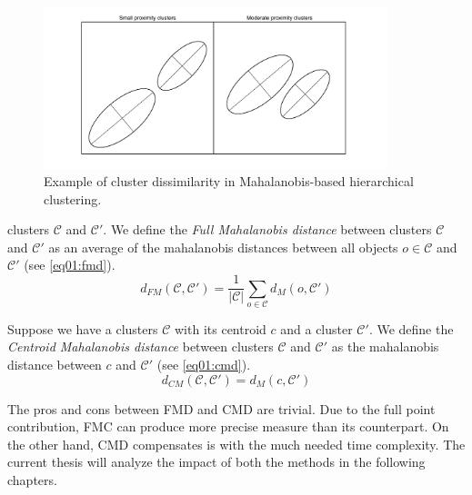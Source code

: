 \begin{figure}\centering
	\includegraphics[width=10cm]{img/ellipses}
	\caption{Example of cluster dissimilarity in Mahalanobis-based hierarchical clustering. }
	\label{fig01:ellipses}
\end{figure}

\begin{defn}[\xxx{???}]
	 clusters $\mathcal{C}$ and $\mathcal{C}'$. We define the \emph{Full Mahalanobis distance} between clusters $\mathcal{C}$ and $\mathcal{C}'$ as an average of the mahalanobis distances between all  objects $o \in \mathcal{C}$ and $\mathcal{C}'$ (see \ref{eq01:fmd}).
	\begin{equation}\label{eq01:fmd}
	d_{FM}(\mathcal{C},\mathcal{C}') =\frac{1}{|\mathcal{C}|}\sum_{o\in\mathcal{C}}{d_M(o,\mathcal{C}')}
	\end{equation}
	\label{def01:fmd}
\end{defn}

\begin{defn}[???]
	Suppose we have a clusters $\mathcal{C}$ with its centroid $c$ and a cluster $\mathcal{C}'$. We define the \emph{Centroid Mahalanobis distance} between clusters $\mathcal{C}$ and $\mathcal{C}'$ as the mahalanobis distance between $c$ and $\mathcal{C}'$ (see \ref{eq01:cmd}).
	\begin{equation}\label{eq01:cmd}
	d_{CM}(\mathcal{C},\mathcal{C}')=d_M(c,\mathcal{C}')
	\end{equation}
	\label{def01:cmd}
\end{defn}


The pros and cons between FMD and CMD are trivial. Due to the full point contribution, FMC can produce more precise measure than its counterpart. On the other hand, CMD compensates is with the much needed time complexity. The current thesis will analyze the impact of both the methods in the following chapters.

